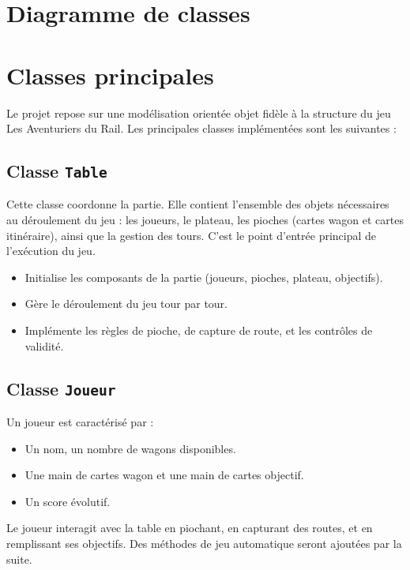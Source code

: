 \documentclass[a4paper,12pt]{report}
\begin{document}
\section{Diagramme de classes}



\section{Classes principales}

Le projet repose sur une modélisation orientée objet fidèle à la structure du jeu Les Aventuriers du Rail.
Les principales classes implémentées sont les suivantes :

\subsection*{Classe \texttt{Table}}

Cette classe coordonne la partie. Elle contient l’ensemble des objets nécessaires au déroulement du jeu :
les joueurs, le plateau, les pioches (cartes wagon et cartes itinéraire), ainsi que la gestion des tours.
C’est le point d’entrée principal de l’exécution du jeu.

\begin{itemize}
    \item Initialise les composants de la partie (joueurs, pioches, plateau, objectifs).
    \item Gère le déroulement du jeu tour par tour.
    \item Implémente les règles de pioche, de capture de route, et les contrôles de validité.
\end{itemize}

\subsection*{Classe \texttt{Joueur}}

Un joueur est caractérisé par :
\begin{itemize}
    \item Un nom, un nombre de wagons disponibles.
    \item Une main de cartes wagon et une main de cartes objectif.
    \item Un score évolutif.
\end{itemize}
Le joueur interagit avec la table en piochant, en capturant des routes, et en remplissant ses objectifs.
Des méthodes de jeu automatique seront ajoutées par la suite.
\end{document}
